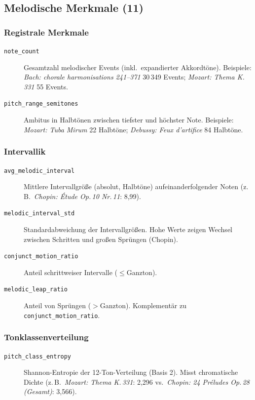 \documentclass[12pt,a4paper]{article}
\theoremstyle{definition}
\begin{document}
\subsection{Melodische Merkmale (11)}

\subsubsection*{Registrale Merkmale}
\begin{description}
    \item[\texttt{note\_count}] Gesamtzahl melodischer Events (inkl.\ expandierter Akkordtöne). Beispiele: \emph{Bach: chorale harmonisations 241--371} 30\,349 Events; \emph{Mozart: Thema K.\,331} 55 Events.
    
    \item[\texttt{pitch\_range\_semitones}] Ambitus in Halbtönen zwischen tiefster und höchster Note. Beispiele: \emph{Mozart: Tuba Mirum} 22 Halbtöne; \emph{Debussy: Feux d'artifice} 84 Halbtöne.
\end{description}

\subsubsection*{Intervallik}
\begin{description}
    \item[\texttt{avg\_melodic\_interval}] Mittlere Intervallgröße (absolut, Halbtöne) aufeinanderfolgender Noten (z.\,B.\ \emph{Chopin: Étude Op.\,10 Nr.\,11}: 8{,}99).
    
    \item[\texttt{melodic\_interval\_std}] Standardabweichung der Intervallgrößen. Hohe Werte zeigen Wechsel zwischen Schritten und großen Sprüngen (Chopin).
    
    \item[\texttt{conjunct\_motion\_ratio}] Anteil schrittweiser Intervalle ($\leq$Ganzton).
    
    \item[\texttt{melodic\_leap\_ratio}] Anteil von Sprüngen ($>$Ganzton). Komplementär zu \texttt{conjunct\_motion\_ratio}.
\end{description}

\subsubsection*{Tonklassenverteilung}
\begin{description}
    \item[\texttt{pitch\_class\_entropy}] Shannon-Entropie der 12-Ton-Verteilung (Basis 2). Misst chromatische Dichte (z.\,B.\ \emph{Mozart: Thema K.\,331}: 2{,}296 vs.\ \emph{Chopin: 24 Préludes Op.\,28 (Gesamt)}: 3{,}566).
\end{description}
\end{document}
